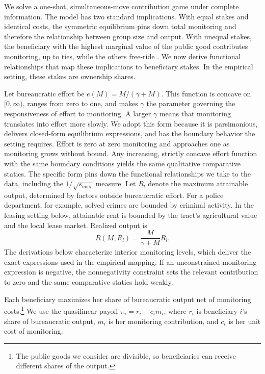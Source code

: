 \documentclass[12pt]{article}
\begin{document}
We solve a one-shot, simultaneous-move contribution game under complete information. The model has two standard implications. With equal stakes and identical costs, the symmetric equilibrium pins down total monitoring and therefore the relationship between group size and output. With unequal stakes, the beneficiary with the highest marginal value of the public good contributes monitoring, up to ties, while the others free-ride \citep{Olson1965, BergstromBlumeVarian1986}. We now derive functional relationships that map these implications to beneficiary stakes. In the empirical setting, these stakes are ownership shares.

Let bureaucratic effort be $e(M)=M/(\gamma+M)$. This function is concave on $[0, \infty)$, ranges from zero to one, and makes $\gamma$ the parameter governing the responsiveness of effort to monitoring. A larger $\gamma$ means that monitoring translates into effort more slowly. We adopt this form because it is parsimonious, delivers closed-form equilibrium expressions, and has the boundary behavior the setting requires. Effort is zero at zero monitoring and approaches one as monitoring grows without bound. Any increasing, strictly concave effort function with the same boundary conditions yields the same qualitative comparative statics. The specific form pins down the functional relationships we take to the data, including the $1/\sqrt{s_{\max}}$ measure. Let $R_l$ denote the maximum attainable output, determined by factors outside bureaucratic effort. For a police department, for example, solved crimes are bounded by criminal activity. In the leasing setting below, attainable rent is bounded by the tract's agricultural value and the local lease market. Realized output is
\begin{equation} \label{(1)}
    R(M, R_l) = \frac{M}{\gamma + M}R_l.
\end{equation}
The derivations below characterize interior monitoring levels, which deliver the exact expressions used in the empirical mapping. If an unconstrained monitoring expression is negative, the nonnegativity constraint sets the relevant contribution to zero and the same comparative statics hold weakly.

Each beneficiary maximizes her share of bureaucratic output net of monitoring costs.\footnote{The public goods we consider are divisible, so beneficiaries can receive different shares of the output.} We use the quasilinear payoff $\pi_i=r_i-c_i m_i$, where $r_i$ is beneficiary $i$'s share of bureaucratic output, $m_i$ is her monitoring contribution, and $c_i$ is her unit cost of monitoring.
\end{document}

